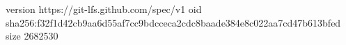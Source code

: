 version https://git-lfs.github.com/spec/v1
oid sha256:f32f1d42cb9aa6d55af7cc9bdcceca2cdc8baade384e8c022aa7cd47b613bfed
size 2682530
